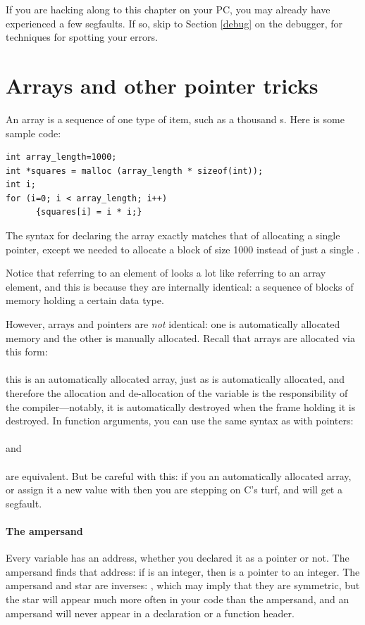 \documentclass[12pt]{article}
\begin{document}
If you are hacking along to this chapter on your PC, you may already
have experienced a few segfaults. If so, skip to 
Section \ref{debug} on the debugger, for techniques for spotting your
errors.

\section{Arrays and other pointer tricks} \label{for_loops} 

An array is a sequence of one type of item, such as a thousand s. Here is some sample code:
\begin{lstlisting}
int array_length=1000;
int *squares = malloc (array_length * sizeof(int));
int i;
for (i=0; i < array_length; i++)
      {squares[i] = i * i;}
\end{lstlisting}
The syntax for declaring the array exactly matches that of allocating
a single pointer, except we needed to allocate a block of size 1000
 instead of just a single . 

Notice that referring to an element of  looks a lot
like referring to an array element, and this is because they are
internally identical: a sequence of blocks of memory holding a certain
data type. 

However, arrays and pointers are {\em not} identical: one is
automatically allocated memory and the other is manually allocated.
Recall that arrays are allocated via this form:\\
\\
this is an automatically allocated array, just
as  is automatically allocated, and therefore
the allocation and de-allocation of the variable is the responsibility
of the compiler---notably, it is automatically destroyed when the frame
holding it is destroyed. In function arguments, you can use the same
syntax as with pointers: 
\\ \\
and
\\ \\
are equivalent.
But be careful with this: if you  an automatically allocated
array, or assign it a new value with  then you are stepping
on C's turf, and will get a segfault.

\paragraph{The ampersand}\index{\&} Every variable has an address, whether you
declared it as a pointer or not. The ampersand finds that address: if
 is an integer, then  is a pointer to an integer.
The ampersand and star are inverses: , which
may imply that they are symmetric, but the star will appear much more
often in your code than the ampersand, and 
an ampersand will never appear in a declaration or a function header.
\end{document}
